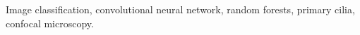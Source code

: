 Image classification, convolutional neural network, random forests, primary cilia, confocal microscopy.

